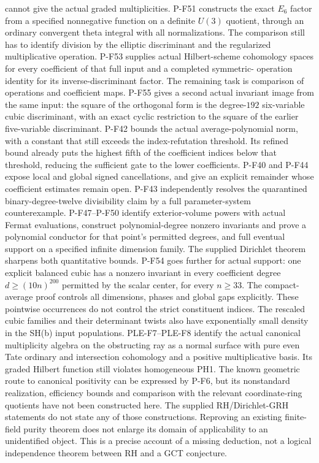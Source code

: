 \documentclass[11pt,a4paper]{article}
\begin{document}
cannot give the actual graded multiplicities.
P-F51 constructs the exact $E_6$ factor from a specified
nonnegative function on a definite $U(3)$ quotient, through
an ordinary convergent theta integral with all normalizations.
The comparison still has to identify division by the elliptic
discriminant and the regularized multiplicative operation.
P-F53 supplies actual Hilbert-scheme cohomology spaces for
every coefficient of that full input and a completed symmetric-
operation identity for its inverse-discriminant factor. The
remaining task is comparison of operations and coefficient maps.
P-F55 gives a second actual invariant image from the same input:
the square of the orthogonal form is the degree-$192$
six-variable cubic discriminant, with an exact cyclic restriction
to the square of the earlier five-variable discriminant.
P-F42 bounds the actual average-polynomial norm, with a constant
that still exceeds the index-refutation threshold. Its refined
bound already puts the highest fifth of the coefficient indices
below that threshold, reducing the sufficient gate to the lower
coefficients. P-F40 and
P-F44 expose local and global signed cancellations, and give
an explicit remainder whose coefficient estimates remain open.
P-F43 independently resolves the quarantined binary-degree-twelve
divisibility claim by a full parameter-system counterexample.
P-F47--P-F50 identify exterior-volume powers with actual Fermat
evaluations, construct polynomial-degree nonzero invariants and
prove a polynomial conductor for that point's permitted degrees,
and full eventual support on a specified infinite dimension family.
The supplied Dirichlet theorem sharpens both quantitative bounds.
P-F54 goes further for actual support: one explicit balanced
cubic has a nonzero invariant in every coefficient degree
$d\ge(10n)^{200}$ permitted by the scalar center, for every
$n\ge33$. The compact-average proof controls all dimensions,
phases and global gaps explicitly.
These pointwise occurrences do not control the strict constituent
indices. The rescaled cubic families and their determinant twists
also have exponentially small density in the SH(b) input populations.
PLE-F7--PLE-F8 identify the actual canonical multiplicity algebra on
the obstructing ray as a normal surface with pure even Tate ordinary
and intersection cohomology and a positive multiplicative basis.
Its graded Hilbert function still violates homogeneous PH1.
The known geometric route to
canonical positivity can be expressed by P-F6, but its nonstandard
realization, efficiency bounds and comparison with the relevant
coordinate-ring quotients have not been constructed here.
The supplied RH/Dirichlet-GRH statements do not state any of those
constructions. Reproving an existing finite-field purity theorem does
not enlarge its domain of applicability to an unidentified object.
This is a precise account of a missing deduction, not a logical
independence theorem between RH and a GCT conjecture.
\end{document}
